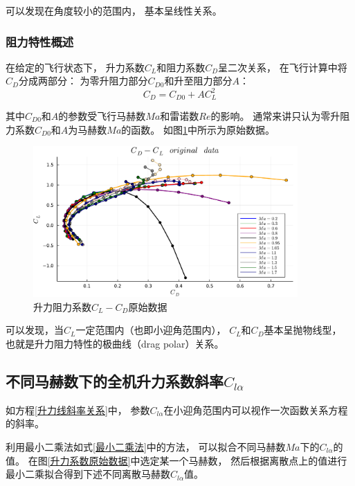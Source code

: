 可以发现在角度较小的范围内，
基本呈线性关系。

\subsubsection{阻力特性概述}

在给定的飞行状态下，
升力系数$C_L$和阻力系数$C_D$呈二次关系，
在飞行计算中将$C_D$分成两部分：
为零升阻力部分$C_{D0}$和升至阻力部分$A$：
\begin{equation}
    \label{极曲线关系}
    C_D = C_{D0} + AC_{L}^2
\end{equation}

其中$C_{D0}$和$A$的参数受飞行马赫数$Ma$和雷诺数$Re$的影响。
通常来讲只认为零升阻力系数$C_{D0}$和$A$为马赫数$Ma$的函数。
如图\ref{升力阻力系数原始数据}中所示为原始数据。

\begin{figure}[H]
    \centering
    \includegraphics[width=0.9\textwidth]{image/ch3/CLCD_origin.pdf}
    \caption{升力阻力系数$C_L-C_D$原始数据}
    \label{升力阻力系数原始数据}
\end{figure}

可以发现，当$C_L$一定范围内（也即小迎角范围内），
$C_L$和$C_D$基本呈抛物线型，
也就是升力阻力特性的极曲线（drag polar）关系。




\subsection{不同马赫数下的全机升力系数斜率$C_{l\alpha}$}

如方程\ref{升力线斜率关系}中，
参数$C_{l\alpha}$在小迎角范围内可以视作一次函数关系方程的斜率。

利用最小二乘法如式\ref{最小二乘法}中的方法，
可以拟合不同马赫数$Ma$下的$C_{l\alpha}$的值。
在图\ref{升力系数原始数据}中选定某一个马赫数，
然后根据离散点上的值进行最小二乘拟合得到下述不同离散马赫数$C_{l\alpha}$值。


